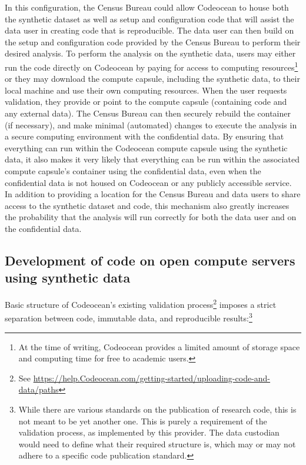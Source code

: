 \documentclass[inline]{hdsr}
\begin{document}
In this configuration, the Census Bureau could allow Codeocean to house both the synthetic dataset as well as
setup and configuration code that will assist the data user in creating code that is reproducible. The data
user can then build on the setup and configuration code provided by the Census Bureau to perform their
desired analysis. To perform the analysis on the synthetic data, users may either run the code directly on
Codeocean by paying for access to computing resources\footnote{At the time of writing, Codeocean  provides a limited amount of storage space and computing time for free to academic users.} or they may download the compute capsule, including the synthetic data, to their local
machine and use their own computing resources. When the user requests validation, they provide or point to the compute capsule (containing code and any external data). The Census Bureau can then  securely rebuild the container (if necessary), and make minimal (automated) changes to execute the analysis in a
secure computing environment with the confidential data. By ensuring that everything can
run within the Codeocean compute capsule using the synthetic data, it also makes it very likely that everything can
be run within the associated compute capsule's container using the confidential data, even when the confidential data is not housed on Codeocean or any publicly accessible service.
In addition to providing a location for the Census Bureau and data users to share access to the synthetic
dataset and code, this mechanism also greatly increases the probability that the analysis will run correctly for both the data user and on the
confidential data. 



\subsection{Development of code on open compute servers using synthetic data}

Basic structure of Codeocean's existing validation process\footnote{See \url{https://help.Codeocean.com/getting-started/uploading-code-and-data/paths}} imposes a strict separation between code, immutable data, and reproducible results:\footnote{While there are various standards on the publication of research code, this is not meant to be yet another one. This is purely a requirement of the validation process, as implemented by this provider. The data custodian would need to define what their required structure is, which may or may not adhere to a specific code publication standard.}
\end{document}
